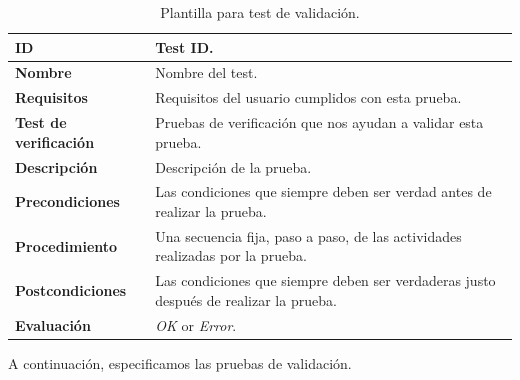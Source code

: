 \begin{center}
\begin{table}[htb]
\centering
\begin{tabular}{@{}p{2.5cm} p{9cm}@{}} 
\toprule
\textbf{ID} 					& Test ID. \\
\midrule
\textbf{Nombre} 				& Nombre del test. \\
\midrule
\textbf{Requisitos} 		& Requisitos del usuario cumplidos con esta prueba. \\
\midrule
\textbf{Test de verificación} 	& Pruebas de verificación que nos ayudan a validar esta prueba. \\
\midrule
\textbf{Descripción} 		& Descripción de la prueba. \\
\midrule
\textbf{Precondiciones}		& Las condiciones que siempre deben ser verdad antes de realizar la prueba. \\
\midrule
\textbf{Procedimiento}			& Una secuencia fija, paso a paso, de las actividades realizadas por la prueba. \\
\midrule
\textbf{Postcondiciones} 		& Las condiciones que siempre deben ser verdaderas justo después de realizar la prueba. \\
\midrule
\textbf{Evaluación} 			& \textit{OK} or \textit{Error}. \\
\bottomrule
\end{tabular}
\caption{Plantilla para test de validación.}
\label{tab:validation_tests}
\end{table}
\end{center}


A continuación, especificamos las pruebas de validación.

